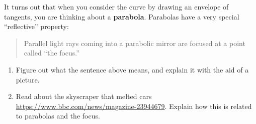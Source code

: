 \documentclass[noauthor,nooutcomes,hints,handout]{../ximera}
\begin{document}
\begin{question}
  It turns out that when you consider the curve by drawing an envelope
  of tangents, you are thinking about a \textbf{parabola}. Parabolas
  have a very special ``reflective'' property:
  \begin{quote}
    Parallel light rays coming into a parabolic mirror are focused at
    a point called ``the focus.''
  \end{quote}
  \begin{enumerate}
  \item Figure out what the sentence above means, and explain it with
    the aid of a picture.
  \item Read about the skyscraper that melted cars \url{https://www.bbc.com/news/magazine-23944679}. Explain how this is related to parabolas and the focus.
    \end{enumerate}
\end{question}
\end{document}
